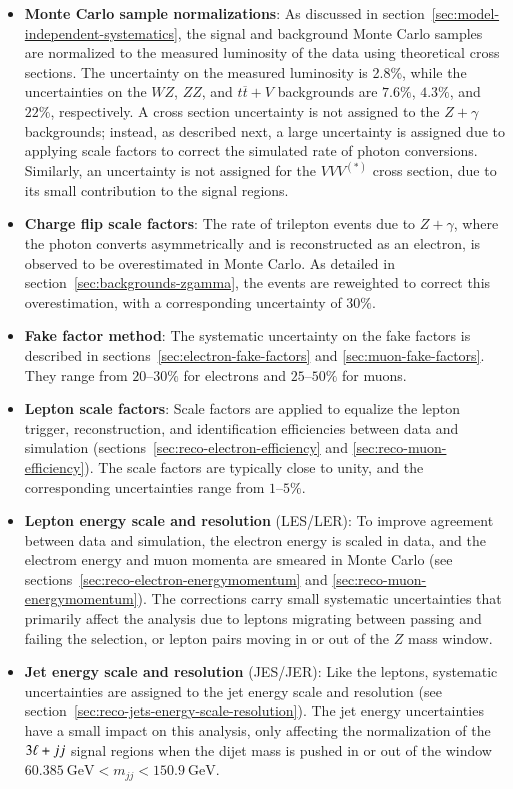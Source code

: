 \begin{itemize}
	\item \textbf{Monte Carlo sample normalizations}: As discussed in section~\ref{sec:model-independent-systematics}, the signal and background Monte Carlo samples are normalized to the measured luminosity of the data using theoretical cross sections. The uncertainty on the measured luminosity is 2.8\%, while the uncertainties on the $WZ$, $ZZ$, and $t\overline{t}+V$ backgrounds are $7.6\%$, $4.3\%$, and $22\%$, respectively. A cross section uncertainty is not assigned to the $Z+\gamma$ backgrounds; instead, as described next, a large uncertainty is assigned due to applying scale factors to correct the simulated rate of photon conversions. Similarly, an uncertainty is not assigned for the $VVV^{(*)}$ cross section, due to its small contribution to the signal regions. 

	\item \textbf{Charge flip scale factors}: The rate of trilepton events due to $Z+\gamma$, where the photon converts asymmetrically and is reconstructed as an electron, is observed to be overestimated in Monte Carlo. As detailed in section~\ref{sec:backgrounds-zgamma}, the events are reweighted to correct this overestimation, with a corresponding uncertainty of $30\%$.

	\item \textbf{Fake factor method}: The systematic uncertainty on the fake factors is described in sections~\ref{sec:electron-fake-factors} and \ref{sec:muon-fake-factors}. They range from $20$--$30\%$ for electrons and $25$--$50\%$ for muons. 

	\item \textbf{Lepton scale factors}: Scale factors are applied to equalize the lepton trigger, reconstruction, and identification efficiencies between data and simulation (sections~\ref{sec:reco-electron-efficiency} and \ref{sec:reco-muon-efficiency}). The scale factors are typically close to unity, and the corresponding uncertainties range from $1$--$5\%$.

	\item \textbf{Lepton energy scale and resolution} (LES/LER): To improve agreement between data and simulation, the electron energy is scaled in data, and the electrom energy and muon momenta are smeared in Monte Carlo (see sections~\ref{sec:reco-electron-energymomentum} and \ref{sec:reco-muon-energymomentum}). The corrections carry small systematic uncertainties that primarily affect the analysis due to leptons migrating between passing and failing the selection, or lepton pairs moving in or out of the $Z$ mass window. 

	\item \textbf{Jet energy scale and resolution} (JES/JER): Like the leptons, systematic uncertainties are assigned to the jet energy scale and resolution (see section~\ref{sec:reco-jets-energy-scale-resolution}). The jet energy uncertainties have a small impact on this analysis, only affecting the normalization of the $3\ell+jj$ signal regions when the dijet mass is pushed in or out of the window $\SI{60.385}{\giga\electronvolt}<m_{jj}<\SI{150.9}{\giga\electronvolt}$. 
\end{itemize}

